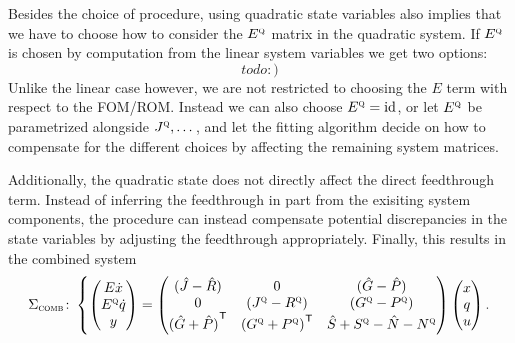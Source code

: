 Besides the choice of procedure, using quadratic state variables also implies that we have to choose how to consider the $E^{\textnormal{\scshape q}}$ matrix in the quadratic system.
If $E^{\textnormal{\scshape q}}$ is chosen by computation from the linear system variables we get two options:
\begin{equation*}
    todo :)
\end{equation*}
Unlike the linear case however, we are not restricted to choosing the $E$ term with respect to the \ac{FOM}/\ac{ROM}.
Instead we can also choose $E^{\textnormal{\scshape q}} = \text{id}_{}$, or let $E^{\textnormal{\scshape q}}$ be parametrized alongside $J^{\textnormal{\scshape q}}, \dots$, and let the fitting algorithm decide on how to compensate for the different choices by affecting the remaining system matrices.


Additionally, the quadratic state does not directly affect the direct feedthrough term.
Instead of inferring the feedthrough in part from the exisiting system components, the procedure can instead compensate potential discrepancies in the state variables by adjusting the feedthrough appropriately.
Finally, this results in the combined system
\begin{equation}\label{eq:combined-quadratic-system}
    \Sigma_{\textnormal{\scshape comb}} \colon \left\lbrace
    \begin{pmatrix}
        E \dot{x} \\
        E^{\textnormal{\scshape q}} \dot{q} \\
        y
    \end{pmatrix} = \begin{pmatrix}
        (\hat{J} - \hat{R}) & 0 & (\hat{G} - \hat{P}) \\
        0 & (J^{\textnormal{\scshape q}} - R^{\textnormal{\scshape q}}) & (G^{\textnormal{\scshape q}} - P^{\textnormal{\scshape q}}) \\
        {(\hat{G} + \hat{P})}^{\mkern1mu \mathsf{T}} & {(G^{\textnormal{\scshape q}} + P^{\textnormal{\scshape q}})}^{\mkern1mu \mathsf{T}} & \hat{S} + S^{\textnormal{\scshape q}} - \hat{N} - N^{\textnormal{\scshape q}}
    \end{pmatrix} \begin{pmatrix}
        x \\
        q \\
        u
    \end{pmatrix}.
    \right.
\end{equation}


